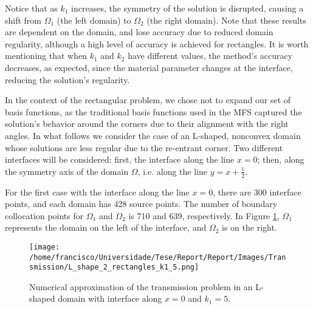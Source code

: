 \documentclass[5p,authoryear]{elsarticle}
\begin{document}
Notice that as \(k_1\) increases, the symmetry of the solution is disrupted, causing a shift from \(\Omega_1\) (the left domain) to \(\Omega_2\) (the right domain). Note that these results are dependent on the domain, and lose accuracy due to reduced domain regularity, although a high level of accuracy is achieved for rectangles. It is worth mentioning that when \(k_1\) and \(k_2\) have different values, the method's accuracy decreases, as expected, since the material parameter changes at the interface, reducing the solution's regularity.

In the context of the rectangular problem, we chose not to expand our set of basis functions, as the traditional basis functions used in the MFS captured the solution's behavior around the corners due to their alignment with the right angles. In what follows we consider the case of an L-shaped, nonconvex domain whose solutions are less regular due to the re-entrant corner. Two different interfaces will be considered: first, the interface along the line \(x=0\); then, along the symmetry axis of the domain \(\Omega\), i.e. along the line \(y=x+\frac{1}{2}\).

For the first case with the interface along the line \(x=0\), there are 300 interface points, and each domain has 428 source points. The number of boundary collocation points for \(\Omega_1\) and \(\Omega_2\) is 710 and 639, respectively. In Figure \ref{transmission_L_shape_k1_5}, \(\Omega_1\) represents the domain on the left of the interface, and \(\Omega_2\) is on the right.
\begin{figure}
    \centering
    \texttt{[image: /home/francisco/Universidade/Tese/Report/Report/Images/Transmission/L\_shape\_2\_rectangles\_k1\_5.png]}
    \captionsetup{width=\linewidth} %
    \caption{Numerical approximation of the transmission problem in an L-shaped domain with interface along \(x=0\) and \(k_1=5\).}
    \label{transmission_L_shape_k1_5}
\end{figure}
\end{document}
